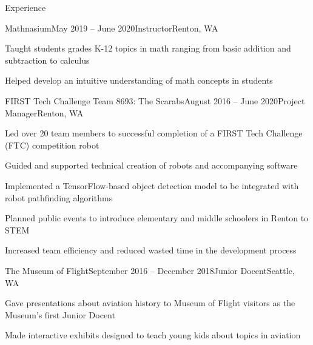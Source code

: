 \documentclass{resume} %
\begin{document}

\begin{rSection}{Experience}

\begin{rSubsection}{Mathnasium}{May 2019 – June 2020}{Instructor}{Renton, WA}
\item Taught students grades K-12 topics in math ranging from basic addition and subtraction to calculus
\item Helped develop an intuitive understanding of math concepts in students
\end{rSubsection}

\begin{rSubsection}{FIRST Tech Challenge Team 8693: The Scarabs}{August 2016 – June 2020}{Project Manager}{Renton, WA}
\item Led over 20 team members to successful completion of a FIRST Tech Challenge (FTC) competition robot
\item Guided and supported technical creation of robots and accompanying software
\item Implemented a TensorFlow-based object detection model to be integrated with robot pathfinding algorithms
\item Planned public events to introduce elementary and middle schoolers in Renton to STEM
\item Increased team efficiency and reduced wasted time in the development process
\end{rSubsection}

\begin{rSubsection}{The Museum of Flight}{September 2016 – December 2018}{Junior Docent}{Seattle, WA}
\item Gave presentations about aviation history to Museum of Flight visitors as the Museum's first Junior Docent
\item Made interactive exhibits designed to teach young kids about topics in aviation
\end{rSubsection}

\end{rSection}

\end{document}
